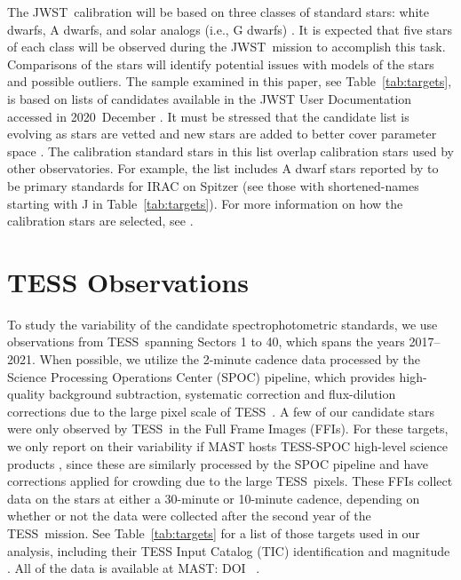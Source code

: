 \documentclass[twocolumn]{aastex631}
\newcommand{\webb}{JWST}
\newcommand{\jwst}{JWST}
\newcommand{\tess}{TESS}
\begin{document}
The \webb\ calibration will be based on three classes of standard stars:  white dwarfs, A dwarfs, and solar analogs (i.e., G dwarfs) \citep{Gordon2022inprep}.  It is expected that five stars of each class will be observed during the \jwst\ mission to accomplish this task.  Comparisons of the stars will identify potential issues with models of the stars and possible outliers.  The sample examined in this paper, see Table~\ref{tab:targets}, is based on lists of candidates available in the JWST User Documentation accessed in 2020~December \citep{jdox}.  It must be stressed that the candidate list is evolving as stars are vetted and new stars are added to better cover parameter space \citep{Gordon2022inprep}.  The calibration standard stars in this list overlap calibration stars used by other observatories. For example, the list includes A dwarf stars reported by \citet{Reach2005} to be primary standards for IRAC on Spitzer (see those with shortened-names starting with J in Table~\ref{tab:targets}). For more information on how the calibration stars are selected, see \citet{Gordon2022inprep}.





\section{TESS Observations}
\label{sec:obs}

To study the variability of the candidate spectrophotometric standards, we use observations from \tess\ spanning Sectors 1 to 40, which spans the years 2017--2021. When possible, we utilize the 2-minute cadence data processed by the Science Processing Operations Center (SPOC) pipeline, which provides high-quality background subtraction, systematic correction and flux-dilution corrections due to the large pixel scale of \tess\ \citep{kdph2020ksciApertures,kdph2020ksciCal,kdph2020ksciPA,kdph2020PDC}. A few of our candidate stars were only observed by \tess\ in the Full Frame Images (FFIs). For these targets, we only report on their variability if MAST hosts \tess-SPOC high-level science products \citep{Caldwell2020spoc}, since these are similarly processed by the SPOC pipeline and have corrections applied for crowding due to the large \tess\ pixels. These FFIs collect data on the stars at either a 30-minute or 10-minute cadence, depending on whether or not the data were collected after the second year of the \tess\ mission. See Table~\ref{tab:targets} for a list of those targets used in our analysis, including their TESS Input Catalog (TIC) identification and magnitude \citep{Stassun2018TIC}. All of the data is available at MAST: DOI~ .
\end{document}

